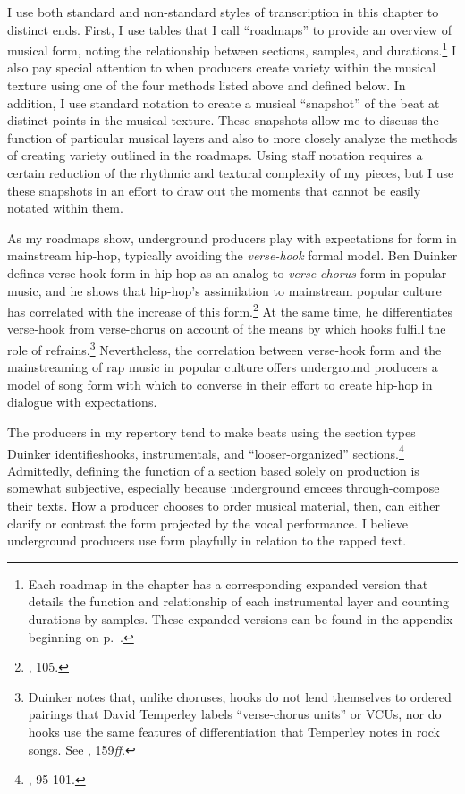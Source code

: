 I use both standard and non-standard styles of transcription in this chapter to distinct ends. First, I use tables that I call ``roadmaps'' to provide an overview of musical form, noting the relationship between sections, samples, and durations.\footnote{Each roadmap in the chapter has a corresponding expanded version that details the function and relationship of each instrumental layer and counting durations by samples. These expanded versions can be found in the appendix beginning on p.~\pageref{appendix:fullroadmaps}.} I also pay special attention to when producers create variety within the musical texture using one of the four methods listed above and defined below. In addition, I use standard notation to create a musical ``snapshot'' of the beat at distinct points in the musical texture. These snapshots allow me to discuss the function of particular musical layers and also to more closely analyze the methods of creating variety outlined in the roadmaps. Using staff notation requires a certain reduction of the rhythmic and textural complexity of my pieces, but I use these snapshots in an effort to draw out the moments that cannot be easily notated within them.

As my roadmaps show, underground producers play with expectations for form in mainstream hip-hop, typically avoiding the \emph{verse-hook} formal model. Ben Duinker defines verse-hook form in hip-hop as an analog to \emph{verse-chorus} form in popular music, and he shows that hip-hop's assimilation to mainstream popular culture has correlated with the increase of this form.\footnote{\cite{benduinkerSongFormMainstreaming2020}, 105.} At the same time, he differentiates verse-hook from verse-chorus on account of the means by which hooks fulfill the role of refrains.\footnote{Duinker notes that, unlike choruses, hooks do not lend themselves to ordered pairings that David Temperley labels ``verse-chorus units'' or VCUs, nor do hooks use the same features of differentiation that Temperley notes in rock songs. See \cite{davidtemperleyMusicalLanguageRock2018}, 159\textit{ff}.} Nevertheless, the correlation between verse-hook form and the mainstreaming of rap music in popular culture offers underground producers a model of song form with which to converse in their effort to create hip-hop in dialogue with expectations.

The producers in my repertory tend to make beats using the section types Duinker identifies\textemdash  hooks, instrumentals, and ``looser-organized'' sections.\footnote{\cite{benduinkerSongFormMainstreaming2020}, 95-101.} Admittedly, defining the function of a section based solely on production is somewhat subjective, especially because underground emcees through-compose their texts. How a producer chooses to order musical material, then, can either clarify or contrast the form projected by the vocal performance. I believe underground producers use form playfully in relation to the rapped text.

